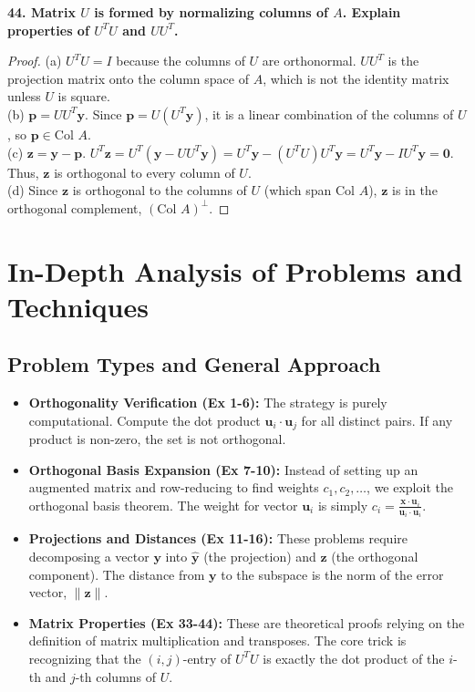 \documentclass[11pt, letterpaper]{article}
\theoremstyle{definition}
\theoremstyle{remark}
\begin{document}
\textbf{44. Matrix $U$ is formed by normalizing columns of $A$. Explain properties of $U^T U$ and $U U^T$.}
\begin{proof}
    (a) $U^T U = I$ because the columns of $U$ are orthonormal. $U U^T$ is the projection matrix onto the column space of $A$, which is not the identity matrix unless $U$ is square. \\
    (b) $\mathbf{p} = U U^T \mathbf{y}$. Since $\mathbf{p} = U (U^T \mathbf{y})$, it is a linear combination of the columns of $U$, so $\mathbf{p} \in \text{Col } A$. \\
    (c) $\mathbf{z} = \mathbf{y} - \mathbf{p}$. $U^T \mathbf{z} = U^T (\mathbf{y} - U U^T \mathbf{y}) = U^T \mathbf{y} - (U^T U) U^T \mathbf{y} = U^T \mathbf{y} - I U^T \mathbf{y} = \mathbf{0}$. Thus, $\mathbf{z}$ is orthogonal to every column of $U$. \\
    (d) Since $\mathbf{z}$ is orthogonal to the columns of $U$ (which span $\text{Col } A$), $\mathbf{z}$ is in the orthogonal complement, $(\text{Col } A)^\perp$.
\end{proof}

\newpage
\section{In-Depth Analysis of Problems and Techniques}

\subsection{Problem Types and General Approach}
\begin{itemize}
    \item \textbf{Orthogonality Verification (Ex 1-6):} The strategy is purely computational. Compute the dot product $\mathbf{u}_i \cdot \mathbf{u}_j$ for all distinct pairs. If any product is non-zero, the set is not orthogonal.
    \item \textbf{Orthogonal Basis Expansion (Ex 7-10):} Instead of setting up an augmented matrix and row-reducing to find weights $c_1, c_2, \dots$, we exploit the orthogonal basis theorem. The weight for vector $\mathbf{u}_i$ is simply $c_i = \frac{\mathbf{x} \cdot \mathbf{u}_i}{\mathbf{u}_i \cdot \mathbf{u}_i}$.
    \item \textbf{Projections and Distances (Ex 11-16):} These problems require decomposing a vector $\mathbf{y}$ into $\hat{\mathbf{y}}$ (the projection) and $\mathbf{z}$ (the orthogonal component). The distance from $\mathbf{y}$ to the subspace is the norm of the error vector, $\|\mathbf{z}\|$.
    \item \textbf{Matrix Properties (Ex 33-44):} These are theoretical proofs relying on the definition of matrix multiplication and transposes. The core trick is recognizing that the $(i,j)$-entry of $U^T U$ is exactly the dot product of the $i$-th and $j$-th columns of $U$.
\end{itemize}
\end{document}

